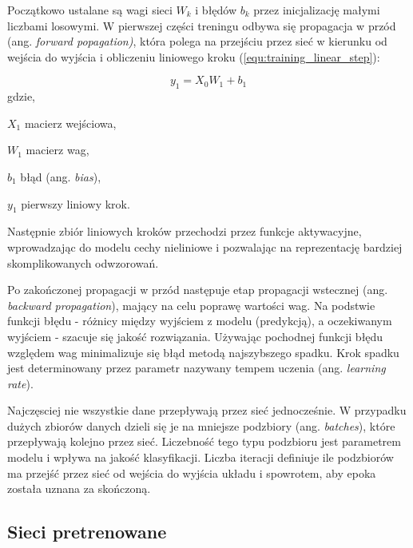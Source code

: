 {\parindent0pt %
Początkowo ustalane są wagi sieci $W_k$ i błędów $b_k$ przez inicjalizację małymi liczbami losowymi. W pierwszej części treningu odbywa się propagacja w przód (ang. \textit{forward popagation)}, która polega na przejściu przez sieć w kierunku od wejścia do wyjścia i obliczeniu liniowego kroku (\ref{equ:training_linear_step}):

\begin{equation}
y_1 = X_0 W_1 + b_1
\label{equ:training_linear_step}
\end{equation}
gdzie,
\begin{eqwhere}[2cm]
	\item[$X_1$] macierz wejściowa,
	\item[$W_1$] macierz wag,
	\item[$b_1$] błąd (ang. \textit{bias}),
	\item[$y_1$] pierwszy liniowy krok.
\end{eqwhere}

Następnie zbiór liniowych kroków przechodzi przez funkcje aktywacyjne, wprowadzając do modelu cechy nieliniowe i pozwalając na reprezentację bardziej skomplikowanych odwzorowań.

Po zakończonej propagacji w przód następuje etap propagacji wstecznej (ang. \textit{backward propagation}), mający na celu poprawę wartości wag. Na podstwie funkcji błędu - różnicy między wyjściem z modelu (predykcją), a oczekiwanym wyjściem - szacuje się jakość rozwiązania. Używając pochodnej funkcji błędu względem wag minimalizuje się błąd metodą najszybszego spadku. Krok spadku jest determinowany przez parametr nazywany tempem uczenia (ang. \textit{learning rate}). 

Najczęsciej nie wszystkie dane przepływają przez sieć jednocześnie. W przypadku dużych zbiorów danych dzieli się je na mniejsze podzbiory (ang. \textit{batches}), które przepływają kolejno przez sieć. Liczebność tego typu podzbioru jest parametrem modelu i wpływa na jakość klasyfikacji. Liczba iteracji definiuje ile podzbiorów ma przejść przez sieć od wejścia do wyjścia układu i spowrotem, aby epoka została uznana za skończoną. 
}

\subsection{Sieci pretrenowane}

